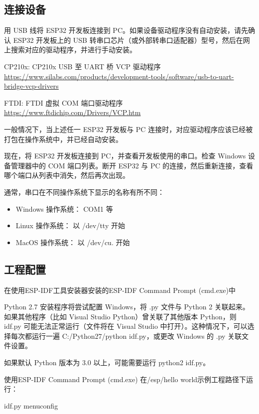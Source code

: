 \subsection{连接设备}

用 USB 线将 ESP32 开发板连接到 PC。如果设备驱动程序没有自动安装，请先确认 ESP32 开发板上的 USB 转串口芯片（或外部转串口适配器）型号，然后在网上搜索对应的驱动程序，并进行手动安装。

CP210x: CP210x USB 至 UART 桥 VCP 驱动程序 \url{https://www.silabs.com/products/development-tools/software/usb-to-uart-bridge-vcp-drivers}

FTDI: FTDI 虚拟 COM 端口驱动程序 \url{https://www.ftdichip.com/Drivers/VCP.htm}

一般情况下，当上述任一 ESP32 开发板与 PC 连接时，对应驱动程序应该已经被打包在操作系统中，并已经自动安装。

现在，将 ESP32 开发板连接到 PC，并查看开发板使用的串口。检查 Windows 设备管理器中的 COM 端口列表。断开 ESP32 与 PC 的连接，然后重新连接，查看哪个端口从列表中消失，然后再次出现。

通常，串口在不同操作系统下显示的名称有所不同：

\begin{itemize}
    \item Windows 操作系统： COM1 等
    \item Linux 操作系统： 以 /dev/tty 开始
    \item MacOS 操作系统： 以 /dev/cu. 开始
\end{itemize}


\subsection{工程配置}

在使用ESP-IDF工具安装器安装的ESP-IDF Command Prompt (cmd.exe)中

Python 2.7 安装程序将尝试配置 Windows，将 .py 文件与 Python 2 关联起来。如果其他程序（比如 Visual Studio Python）曾关联了其他版本 Python，则 idf.py 可能无法正常运行（文件将在 Visual Studio 中打开）。这种情况下，可以选择每次都运行一遍 C:/Python27/python idf.py，或更改 Windows 的 .py 关联文件设置。

如果默认 Python 版本为 3.0 以上，可能需要运行 python2 idf.py。


使用ESP-IDF Command Prompt (cmd.exe) 在/esp/hello world示例工程路径下运行：

\begin{tcolorbox}
    idf.py menuconfig
\end{tcolorbox}

